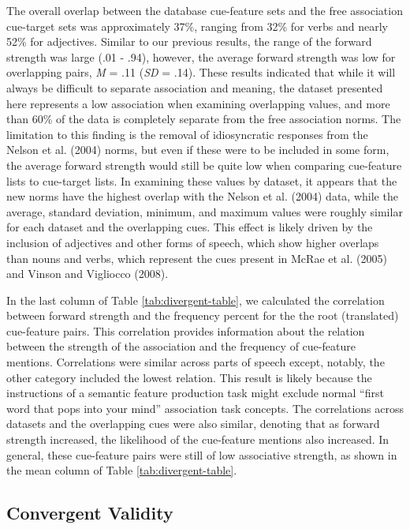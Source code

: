 \documentclass[english,,man]{apa6}
\begin{document}
The overall overlap between the database cue-feature sets and the free association cue-target sets was approximately 37\%, ranging from 32\% for verbs and nearly 52\% for adjectives. Similar to our previous results, the range of the forward strength was large (.01 - .94), however, the average forward strength was low for overlapping pairs, \emph{M} = .11 (\emph{SD} = .14). These results indicated that while it will always be difficult to separate association and meaning, the dataset presented here represents a low association when examining overlapping values, and more than 60\% of the data is completely separate from the free association norms. The limitation to this finding is the removal of idiosyncratic responses from the Nelson et al. (2004) norms, but even if these were to be included in some form, the average forward strength would still be quite low when comparing cue-feature lists to cue-target lists. In examining these values by dataset, it appears that the new norms have the highest overlap with the Nelson et al. (2004) data, while the average, standard deviation, minimum, and maximum values were roughly similar for each dataset and the overlapping cues. This effect is likely driven by the inclusion of adjectives and other forms of speech, which show higher overlaps than nouns and verbs, which represent the cues present in McRae et al. (2005) and Vinson and Vigliocco (2008).

In the last column of Table \ref{tab:divergent-table}, we calculated the correlation between forward strength and the frequency percent for the the root (translated) cue-feature pairs. This correlation provides information about the relation between the strength of the association and the frequency of cue-feature mentions. Correlations were similar across parts of speech except, notably, the other category included the lowest relation. This result is likely because the instructions of a semantic feature production task might exclude normal \enquote{first word that pops into your mind} association task concepts. The correlations across datasets and the overlapping cues were also similar, denoting that as forward strength increased, the likelihood of the cue-feature mentions also increased. In general, these cue-feature pairs were still of low associative strength, as shown in the mean column of Table \ref{tab:divergent-table}.

\hypertarget{convergent-validity}{%
\subsection{Convergent Validity}\label{convergent-validity}}
\end{document}
